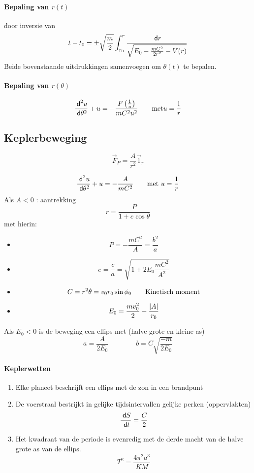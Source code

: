 \paragraph{Bepaling van $r(t)$} door inversie van
\[
  t - t_0 = \pm \sqrt{\frac{m}{2}} \int_{r_0}^{r} \frac{\;\textsf{d}r}{\sqrt{E_0 - \frac{mC^2}{2r^2} - V(r)}}
\]
Beide bovenstaande uitdrukkingen samenvoegen om $\theta(t)$ te bepalen.
\paragraph{Bepaling van $r(\theta)$}
\[
  \frac{\;\textsf{d}^2{u}}{\;\textsf{d}\theta^2} + u = - \frac{F\left( \frac{1}{u} \right)}{mC^2u^2} \qquad \mbox{met} u = \frac{1}{r}
\]




\subsection{Keplerbeweging}
\[
  \vec{F}_P = \frac{A}{r^2} \vec{1}_r
\]

\[
  \frac{\;\textsf{d}^2{u}}{\;\textsf{d}\theta^2} + u = - \frac{A}{mC^2} \qquad \mbox{met } u = \frac{1}{r}
\]
Als $A < 0$ : aantrekking
\[
  r = \frac{P}{1 + e \cos \theta}
\]
met hierin:
\begin{itemize}
 \item \[
         P = -\frac{mC^2}{A} = \frac{b^2}{a}
       \]
 \item \[
         e = \frac{c}{a} = \sqrt{1+2E_0 \frac{mC^2}{A^2}}
       \]
 \item \[
         C = r^2 \dot{\theta} = v_0 r_0 \sin \phi_0 \qquad \mbox{Kinetisch moment}
       \]
 \item \[
         E_0 = \frac{mv_0^2}{2} - \frac{\left| A \right|}{r_0}
       \]
\end{itemize}
Als $E_0 < 0$ is de beweging een ellips met (halve grote en kleine as)
\[
  a = \frac{A}{2E_0} \qquad \qquad b = C \sqrt{\frac{-m}{2E_0}}
\]



\paragraph{Keplerwetten}
\begin{enumerate}
  \item Elke planeet beschrijft een ellips met de zon in een brandpunt
  \item De voerstraal bestrijkt in gelijke tijdsintervallen gelijke perken (oppervlakten)
    \[
      \frac{\;\textsf{d}S}{\;\textsf{d}t} = \frac{C}{2}
    \]
  \item Het kwadraat van de periode is evenredig met de derde macht van de halve grote as van de ellips.
    \[
      T^2 = \frac{4 \pi^2 a^3}{KM}
    \]
\end{enumerate}


